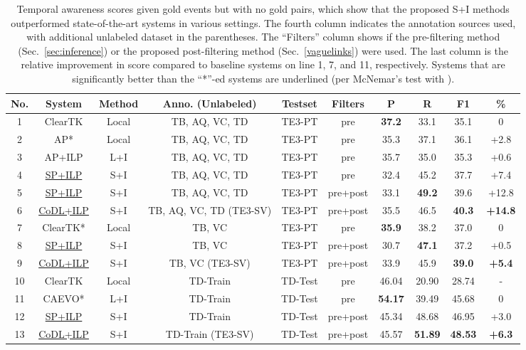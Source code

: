 \documentclass[11pt,letterpaper]{article}
\begin{document}
{\begin{table*}[htbp!]
	\centering
	\caption{\small Temporal awareness scores given gold events but with no gold pairs, which show that the proposed S+I methods outperformed state-of-the-art systems in various settings. The fourth column indicates the annotation sources used, with additional unlabeled dataset in the parentheses. The ``Filters'' column shows if the pre-filtering method (Sec.~\ref{sec:inference}) or the proposed post-filtering method (Sec.~\ref{vaguelinks}) were used. The last column is the relative improvement in  score compared to baseline systems on line 1, 7, and 11, respectively. Systems that are significantly better than the ``*''-ed systems are underlined (per McNemar's test with ).}
	\label{tab: dont know nones}
	\small
	\begin{tabular}{ c|c|c|c|c|c|c|c|c|c } 
		\hline
		No. & System & Method & Anno. (Unlabeled) & Testset & Filters	& P 	& R 	& F1 	& \%\\ 
		\hline
        \hline
		1& ClearTK & Local & TB, AQ, VC, TD &TE3-PT& pre & \textbf{37.2} 	& 33.1 	& 35.1 	& 0  \\ 
		2& AP* & Local & TB, AQ, VC, TD&TE3-PT& pre	& 35.3	& 37.1  & 36.1	& +2.8\\
		3& AP+ILP & L+I&	TB, AQ, VC, TD&TE3-PT& pre & 35.7 	& 35.0 	& 35.3 	& +0.6\\
		4& \underline{SP+ILP} 	& S+I &TB, AQ, VC, TD&TE3-PT& pre	& 32.4 	& 45.2 	& 37.7 	& +7.4 \\5& \underline{SP+ILP} &S+I & TB, AQ, VC, TD&TE3-PT& pre+post
				& 33.1 	& \textbf{49.2} 	& 39.6 	& +12.8\\6& \underline{CoDL+ILP} &S+I & TB, AQ, VC, TD (TE3-SV)&TE3-PT& pre+post
				& 35.5 	& 46.5 	& \textbf{40.3} & \textbf{+14.8}\\
		\hline
        7& ClearTK* & Local & TB, VC &TE3-PT& pre &  \textbf{35.9}	&  38.2	& 37.0	&  0\\  8& \underline{SP+ILP} &S+I & TB, VC&TE3-PT& pre+post
				& 30.7& \textbf{47.1} 	& 37.2   & +0.5 \\9& \underline{CoDL+ILP} &S+I & TB, VC (TE3-SV)&TE3-PT& pre+post
				&33.9  	&45.9  	&\textbf{39.0}  & \textbf{+5.4}\\\hline\hline
		10&ClearTK&Local&TD-Train&TD-Test&pre&46.04& 20.90 & 28.74&-\\
		11&CAEVO*&L+I&TD-Train&TD-Test&pre&\textbf{54.17}& 39.49 & 45.68 & 0\\
		12&\underline{SP+ILP}&S+I&TD-Train&TD-Test&pre+post&45.34 & 48.68 &46.95&+3.0\\
		13&\underline{CoDL+ILP}&S+I&TD-Train (TE3-SV)&TD-Test&pre+post& 45.57 & \textbf{51.89} & \textbf{48.53}& \textbf{+6.3}\\
		\hline
	\end{tabular}
\end{table*}


}
\end{document}
